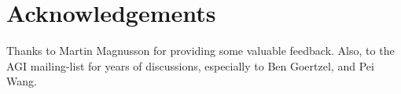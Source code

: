 \documentclass[11pt]{report}
\begin{document}

\setcounter{chapter}{3}
\tableofcontents



\chapter*{Acknowledgements}

Thanks to Martin Magnusson for providing some valuable feedback.  Also, to the AGI mailing-list for years of discussions, especially to Ben Goertzel, and Pei Wang.





\end{document}
